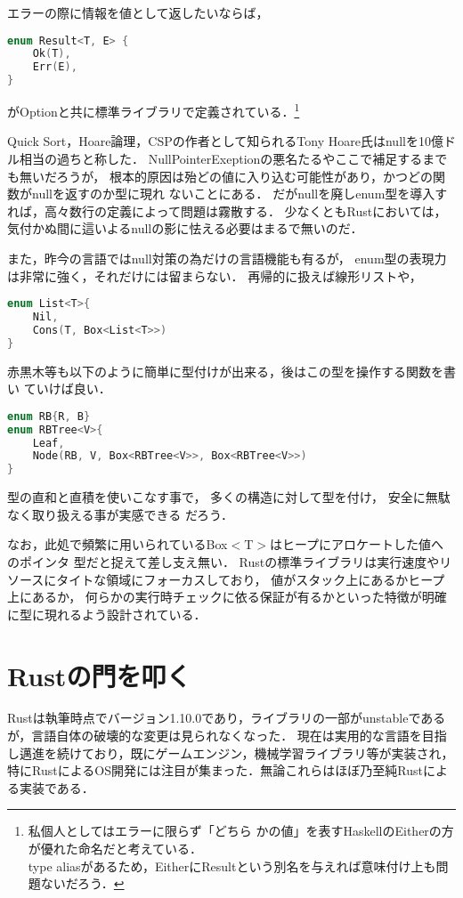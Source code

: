 エラーの際に情報を値として返したいならば，

\begin{lstlisting}[language={C++},caption=Result型,label=result_t]
enum Result<T, E> {
    Ok(T),
    Err(E),
}
\end{lstlisting}

がOptionと共に標準ライブラリで定義されている．\footnote{私個人としてはエラーに限らず「どちら
  かの値」を表すHaskellのEitherの方が優れた命名だと考えている． \\
  type aliasがあるため，EitherにResultという別名を与えれば意味付け上も問題ないだろう．}

Quick Sort，Hoare論理，CSPの作者として知られるTony Hoare氏はnullを10億ドル相当の過ちと称した．
NullPointerExeptionの悪名たるやここで補足するまでも無いだろうが，
根本的原因は殆どの値に入り込む可能性があり，かつどの関数がnullを返すのか型に現れ
ないことにある．
だがnullを廃しenum型を導入すれば，高々数行の定義によって問題は霧散する．
少なくともRustにおいては，気付かぬ間に這いよるnullの影に怯える必要はまるで無いのだ．

また，昨今の言語ではnull対策の為だけの言語機能も有るが，
enum型の表現力は非常に強く，それだけには留まらない．
再帰的に扱えば線形リストや，

\begin{lstlisting}[language={C++},caption=線形リスト,label=list_t]
enum List<T>{
    Nil,
    Cons(T, Box<List<T>>)
}
\end{lstlisting}

赤黒木等も以下のように簡単に型付けが出来る，後はこの型を操作する関数を書い
ていけば良い．

\begin{lstlisting}[language={C++},caption=赤黒木,label=abt_t]
enum RB{R, B}
enum RBTree<V>{
    Leaf,
    Node(RB, V, Box<RBTree<V>>, Box<RBTree<V>>)
}
\end{lstlisting}

型の直和と直積を使いこなす事で，
多くの構造に対して型を付け，
安全に無駄なく取り扱える事が実感できる
だろう．

なお，此処で頻繁に用いられているBox$<$T$>$はヒープにアロケートした値へのポインタ
型だと捉えて差し支え無い．
Rustの標準ライブラリは実行速度やリソースにタイトな領域にフォーカスしており，
値がスタック上にあるかヒープ上にあるか，
何らかの実行時チェックに依る保証が有るかといった特徴が明確に型に現れるよう設計されている．


\section{Rustの門を叩く}
Rustは執筆時点でバージョン1.10.0であり，ライブラリの一部がunstableであるが，言語自体の破壊的な変更は見られなくなった．
現在は実用的な言語を目指し邁進を続けており，既にゲームエンジン，機械学習ライブラリ等が実装され，
特にRustによるOS開発\cite{redox}には注目が集まった．無論これらはほぼ乃至純Rustによる実装である．

